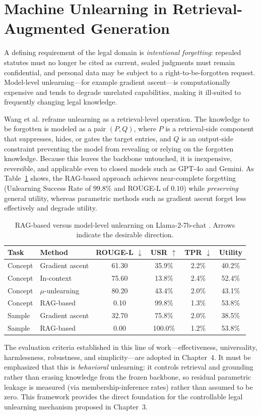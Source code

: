 \section{Machine Unlearning in Retrieval-Augmented Generation}
\label{sec:unlearn}

A defining requirement of the legal domain is \emph{intentional forgetting}: repealed statutes must no longer be cited as current, sealed judgments must remain confidential, and personal data may be subject to a right-to-be-forgotten request. Model-level unlearning---for example gradient ascent---is computationally expensive and tends to degrade unrelated capabilities, making it ill-suited to frequently changing legal knowledge.

Wang et al. \parencite{11207222} reframe unlearning as a retrieval-level operation. The knowledge to be forgotten is modeled as a pair $(P, Q)$, where $P$ is a retrieval-side component that suppresses, hides, or gates the target entries, and $Q$ is an output-side constraint preventing the model from revealing or relying on the forgotten knowledge. Because this leaves the backbone untouched, it is inexpensive, reversible, and applicable even to closed models such as GPT-4o and Gemini. As Table~\ref{tab:rag_unlearn} shows, the RAG-based approach achieves near-complete forgetting (Unlearning Success Rate of $99.8\%$ and ROUGE-L of $0.10$) while \emph{preserving} general utility, whereas parametric methods such as gradient ascent forget less effectively and degrade utility.

\begin{table}[H]
\centering
\small
\caption{RAG-based versus model-level unlearning on Llama-2-7b-chat \parencite{11207222}. Arrows indicate the desirable direction.}
\label{tab:rag_unlearn}
\begin{tabularx}{\textwidth}{l X c c c c}
\hline
\textbf{Task} & \textbf{Method} & \textbf{ROUGE-L $\downarrow$} & \textbf{USR $\uparrow$} & \textbf{TPR $\downarrow$} & \textbf{Utility} \\
\hline
Concept & Gradient ascent & 61.30 & 35.9\% & 2.2\% & 40.2\% \\
Concept & In-context & 75.60 & 13.8\% & 2.4\% & 52.4\% \\
Concept & $\mu$-unlearning & 80.20 & 43.4\% & 2.0\% & 43.1\% \\
Concept & RAG-based & 0.10 & 99.8\% & 1.3\% & 53.8\% \\
Sample & Gradient ascent & 32.70 & 75.8\% & 2.0\% & 38.5\% \\
Sample & RAG-based & 0.00 & 100.0\% & 1.2\% & 53.8\% \\
\hline
\end{tabularx}
\end{table}

The evaluation criteria established in this line of work---effectiveness, universality, harmlessness, robustness, and simplicity---are adopted in Chapter~4. It must be emphasized that this is \emph{behavioral} unlearning: it controls retrieval and grounding rather than erasing knowledge from the frozen backbone, so residual parametric leakage is measured (via membership-inference rates) rather than assumed to be zero. This framework provides the direct foundation for the controllable legal unlearning mechanism proposed in Chapter~3.
